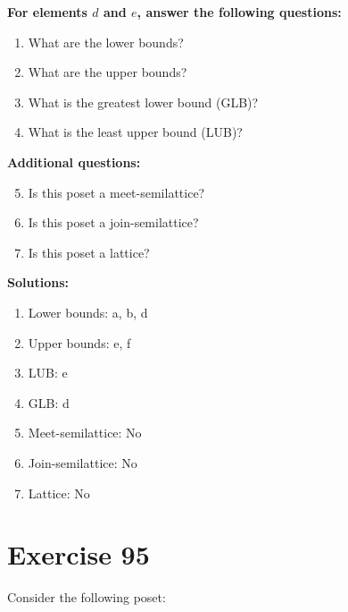 \documentclass{article}
\begin{document}
    \textbf{For elements $d$ and $e$, answer the following questions:}
\begin{enumerate}
    \item What are the lower bounds?
    \item What are the upper bounds?
    \item What is the greatest lower bound (GLB)?
    \item What is the least upper bound (LUB)?
\end{enumerate}
    \hspace*{3ex} \textbf{Additional questions:}
\begin{enumerate}
    \setcounter{enumi}{4}
    \item Is this poset a meet-semilattice?
    \item Is this poset a join-semilattice?
    \item Is this poset a lattice?
\end{enumerate}

\textbf{Solutions:}
\begin{enumerate}
    \item Lower bounds: {a, b, d}
    \item Upper bounds: {e, f}
    \item LUB: e
    \item GLB: d
    \item Meet-semilattice: No
    \item Join-semilattice: No
    \item Lattice: No
\end{enumerate}
\newpage
\section*{Exercise 95}
Consider the following poset:
\begin{center}
\end{center}
\end{document}
